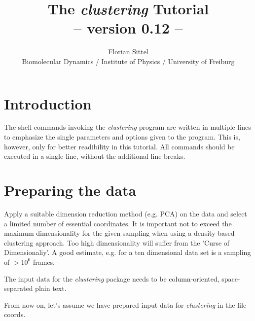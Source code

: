 \documentclass[12pt,a4paper,twoside,english,fleqn]{article}
\begin{document}
\lstset{language=bash}
\lstset{basicstyle=\ttfamily}
\lstset{columns=fullflexible}


\title{\vspace{-3cm}The \emph{clustering} Tutorial\\
                    -- version 0.12 --}
\author{Florian Sittel\\
        Biomolecular Dynamics / Institute of Physics / University of Freiburg}
\maketitle

\section{Introduction}
The shell commands invoking the \emph{clustering} program are written in
multiple lines to emphasize the single parameters and options given to the
program. This is, however, only for better readibility in this tutorial.
All commands should be executed in a single line, without the additional line
breaks.


\section{Preparing the data}
Apply a suitable dimension reduction method (e.g. PCA) on the data and select a
limited number of essential coordinates.
It is important not to exceed the maximum dimensionality for the given sampling
when using a density-based clustering approach.
Too high dimensionality will suffer from the 'Curse of Dimensionaliy'.
A good estimate, e.g. for a ten dimensional data set is a sampling of $> 10^6$
frames.

The input data for the \emph{clustering} package needs to be column-oriented,
space-separated plain text.

From now on, let's assume we have prepared input data for \emph{clustering} in
the file {\ttfamily coords}.
\end{document}

